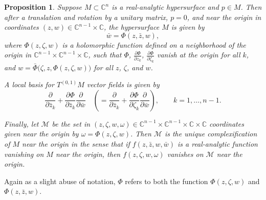 \documentclass[12pt,openany]{book}
\newcommand{\C}{{\mathbb{C}}}
\newcommand{\sM}{{\mathscr{M}}}
\theoremstyle{plain}
\newtheorem{prop}[thm]{Proposition}
\theoremstyle{remark}
\theoremstyle{definition}
\theoremstyle{exercise}
\theoremstyle{example}
\begin{document}
\begin{prop} \label{prop:complexificationofrasurface}
Suppose $M \subset \C^n$ is a real-analytic hypersurface and $p \in M$.
Then after a translation and rotation by a unitary matrix, $p=0$, and near
the origin in coordinates $(z,w) \in \C^{n-1} \times \C$,
the hypersurface $M$ is given by
\begin{equation*}
\bar{w} = \Phi(z,\bar{z},w) ,
\end{equation*}
where $\Phi(z,\zeta,w)$ is a holomorphic function defined on a neighborhood of the origin
in $\C^{n-1} \times \C^{n-1} \times \C$,
such that
$\Phi$,
$\frac{\partial \Phi}{\partial z_k}$,
$\frac{\partial \Phi}{\partial \zeta_k}$
vanish at the origin for all $k$,
and $w = \bar{\Phi}\bigl(\zeta,z,\Phi(z,\zeta,w)\bigr)$
for all $z$, $\zeta$, and $w$.

A local basis for $T^{(0,1)} M$ vector fields is given by
\begin{equation*}
\frac{\partial}{\partial \bar{z}_k}
+\frac{\partial \Phi}{\partial \bar{z}_k} \frac{\partial}{\partial \bar{w}}
\quad
\left(
=
\frac{\partial}{\partial \bar{z}_k}
+\frac{\partial \Phi}{\partial \zeta_k} \frac{\partial}{\partial \bar{w}}
\right)
,
\qquad k=1,\ldots,n-1.
\end{equation*}

Finally, let $\sM$ be the set in
$(z,\zeta,w,\omega) \in \C^{n-1} \times \C^{n-1} \times \C \times \C$
coordinates given near the origin
by $\omega = \Phi(z,\zeta,w)$.
Then $\sM$ is the unique \emph{complexification}
of $M$%
near the origin in the sense that if $f(z,\bar{z},w,\bar{w})$
is a real-analytic function vanishing on $M$ near the origin, then
$f(z,\zeta,w,\omega)$ vanishes on $\sM$ near the origin.
\end{prop}

Again as a slight abuse of notation, $\Phi$ refers to both the function
$\Phi(z,\zeta,w)$ and $\Phi(z,\bar{z},w)$.
\end{document}
